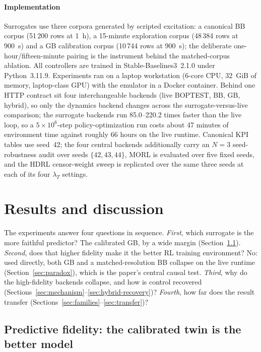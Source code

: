 \documentclass{ieeeaccess}
\begin{document}
\paragraph{Implementation}
Surrogates use three corpora generated by scripted excitation: a canonical BB corpus (51\,200 rows
at \SI{1}{\hour}), a 15-minute exploration corpus (48\,384 rows at \SI{900}{\second}) and a GB
calibration corpus (10\,744 rows at \SI{900}{\second}); the deliberate one-hour/fifteen-minute
pairing is the instrument behind the matched-corpus ablation. All controllers are trained in
Stable-Baselines3~2.1.0 under Python~3.11.9. Experiments ran on a laptop workstation (6-core CPU,
32~GiB of memory, laptop-class GPU) with the emulator in a Docker container. Behind one HTTP contract sit
four interchangeable backends (live BOPTEST, BB, GB, hybrid), so only the dynamics backend changes
across the surrogate-versus-live comparison; the surrogate backends run \numrange{85.0}{220.2} times
faster than the live loop, so a $5\times10^6$-step policy-optimization run costs about 47 minutes of
environment time against roughly 66 hours on the live runtime. Canonical KPI tables use seed~42; the
four central backends additionally carry an $N=3$ seed-robustness audit over seeds
$\{42,43,44\}$, MORL is evaluated over five fixed seeds, and the HDRL censor-weight sweep is replicated over the
same three seeds at each of its four $\lambda_T$ settings.
\section{Results and discussion}\label{sec:results}

The experiments answer four questions in sequence. \emph{First}, which surrogate is the more
faithful predictor? The calibrated GB, by a wide margin (Section~\ref{sec:fidelity}). \emph{Second},
does that higher fidelity make it the better RL training environment? No: used directly, both GB and
a matched-resolution BB collapse on the live runtime (Section~\ref{sec:paradox}), which is the
paper's central causal test. \emph{Third}, why do the high-fidelity backends collapse, and how is
control recovered (Sections~\ref{sec:mechanism}--\ref{sec:hybrid-recovery})? \emph{Fourth}, how far
does the result transfer (Sections~\ref{sec:families}--\ref{sec:transfer})?

\subsection{Predictive fidelity: the calibrated twin is the better model}\label{sec:fidelity}
\end{document}
